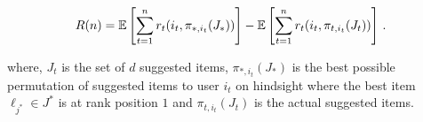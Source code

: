 \begin{align*}
  R(n) =
  \mathbb{E}\left[\sum_{t = 1}^n r_t(i_t, \pi_{\ast, i_t}(J_\ast))\right] - \mathbb{E}\left[\sum_{t = 1}^n r_t(i_t, \pi_{t, i_t}(J_t))\right]\,.
\end{align*}

where, $J_t$ is the set of $d$ suggested items, $\pi_{\ast, i_t}(J_\ast)$ is the best possible permutation of suggested items to user $i_t$ on hindsight where the best item $\ell_{j^*}\in J^*$ is at rank position $1$ and $\pi_{t, i_t}(J_t)$ is the actual suggested items.


%
%
